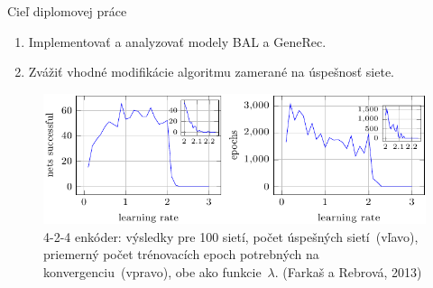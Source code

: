 \documentclass[xcolor=dvipsnames]{beamer}
\begin{document}
\begin{frame}{Cieľ diplomovej práce} 
  \begin{enumerate} 
    \item Implementovať a analyzovať modely BAL a GeneRec. 
    \item Zvážiť vhodné modifikácie algoritmu zamerané na úspešnosť siete. 
  \end{enumerate} 
  
  \begin{figure}[h!]  
    \centering
    \includegraphics[scale=0.40]{img/bal_performance.png}
    \caption{\small 4-2-4 enkóder: výsledky pre 100 sietí, počet úspešných sietí~(vľavo), priemerný počet trénovacích epoch potrebných na konvergenciu~(vpravo), obe ako funkcie~$\lambda$. (Farkaš a Rebrová, 2013)} 
  \end{figure}  
  
\end{frame} 

\end{document}
